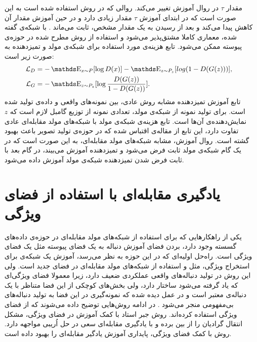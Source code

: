 مقدار $\tau$ در روال آموزش تغییر می‌کند. روالی که در روش استفاده شده است به این صورت است که در ابتدا‌ی آموزش $\tau$ مقدار زیادی دارد و در حین آموزش مقدار آن کاهش پیدا می‌کند و بعد از رسیدن به یک مقدار مشخص، ثابت می‌ماند
\cite{kusner2016gans}.
با شبکه‌ی گفته شده، معماری کاملا مشتق‌پذیر می‌شود و استفاده از روش مطرح شده در حوزه‌ی پیوسته ممکن  می‌شود. تابع هزینه‌ی مورد استفاده برای شبکه‌ی مولد و تمیزدهنده به صورت زیر است:
\begin{equation}
\begin{split}
\mathcal{L}_D &= - \ME_{x \sim P} [\log D(x)] - \ME_{z \sim P_z} [log(1-D(G(z)))], \\
\mathcal{L}_G &= - \ME_{z \sim P_z} [\log  \frac{D(G(z))}{1-D(G(z))} ].
\end{split}
\end{equation}
تابع آموزش تمیزدهنده مشابه روش
عادی، 
بین نمونه‌های واقعی و داده‌ی تولید شده است. برای تولید نمونه از شبکه‌ی مولد، تعدادی نمونه‌ از توزیع گامبل لازم است که $z$ نمایش‌دهنده‌ی آن‌ها است. تابع هزینه‌ی شبکه‌ی مولد با شبکه‌های مولد مقابله‌ای عادی تفاوت دارد، این تابع از مقاله‌ی 
\cite{sonderby2016amortised}
اقتباس شده که در حوزه‌ی تولید تصویر باعث بهبود گشته است. روال آموزش،  مشابه شبکه‌های مولد مقابله‌ای، به این صورت است که در یک گام شبکه‌ی مولد ثابت فرض می‌شود و تمیزدهنده آموزش می‌بیند، در گام بعد با ثابت فرض شدن تمیزدهنده شبکه‌ی مولد آموزش داده می‌شود.

\section{یادگیری مقابله‌ای با استفاده از فضای ویژگی}
یکی از راهکارهایی که برای استفاده از شبکه‌های مولد مقابله‌ای در حوزه‌ی داده‌های گسسته وجود دارد، بردن فضای آموزش دنباله به یک فضای پیوسته مثل یک فضای ویژگی است.
 \newline
 راه‌حل اولیه‌ای که در این حوزه به نظر می‌رسد، آموزش یک شبکه‌ی برای استخراج ویژگی، مثل
 و استفاده از شبکه‌های مولد مقابله‌ای در فضای جدید است. ولی این روش در تولید دنباله‌های واقعی عملکردی ضعیف دارد، زیرا معمولا فضای ویژگی‌ای که یاد گرفته می‌شود ساختار دارد، ولی بخش‌های کوچکی از این فضا متناظر با یک دنباله‌ی معتبر است و در عمل دیده شده که نمونه‌گیری در این فضا به تولید دنباله‌های بی‌مفهومی منجر می‌شود
 \cite{Zhang2017TextGAN}.
در ادامه روش‌هایی توضیح داده می‌شوند که از فضای ویژگی استفاده کرده‌اند. روش جبر استاد
  با کمک آموزش در فضای ویژگی، مشکل انتقال گرادیان را از بین برده و با یادگیری مقابله‌ای سعی در حل اُریبی مواجهه دارد. روش
  با کمک فضای ویژگی، پایداری آموزش یادگیر مقابله‌ای را بهبود داده است.
